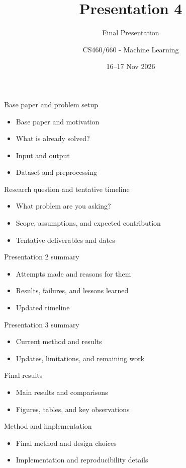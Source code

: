 \documentclass[aspectratio=169]{beamer}
\title{Presentation 4}
\subtitle{Final Presentation}
\author{CS460/660 - Machine Learning}
\date{16--17 Nov 2026}
\begin{document}
\begin{frame}{Base paper and problem setup}
\begin{itemize}
  \item Base paper and motivation
  \item What is already solved?
  \item Input and output
  \item Dataset and preprocessing
\end{itemize}
\end{frame}
\begin{frame}{Research question and tentative timeline}
\begin{itemize}
  \item What problem are you asking?
  \item Scope, assumptions, and expected contribution
  \item Tentative deliverables and dates
\end{itemize}
\end{frame}
\begin{frame}{Presentation 2 summary}
\begin{itemize}
  \item Attempts made and reasons for them
  \item Results, failures, and lessons learned
  \item Updated timeline
\end{itemize}
\end{frame}
\begin{frame}{Presentation 3 summary}
\begin{itemize}
  \item Current method and results
  \item Updates, limitations, and remaining work
\end{itemize}
\end{frame}
\begin{frame}{Final results}
\begin{itemize}
  \item Main results and comparisons
  \item Figures, tables, and key observations
\end{itemize}
\end{frame}
\begin{frame}{Method and implementation}
\begin{itemize}
  \item Final method and design choices
  \item Implementation and reproducibility details
\end{itemize}
\end{frame}
\end{document}
